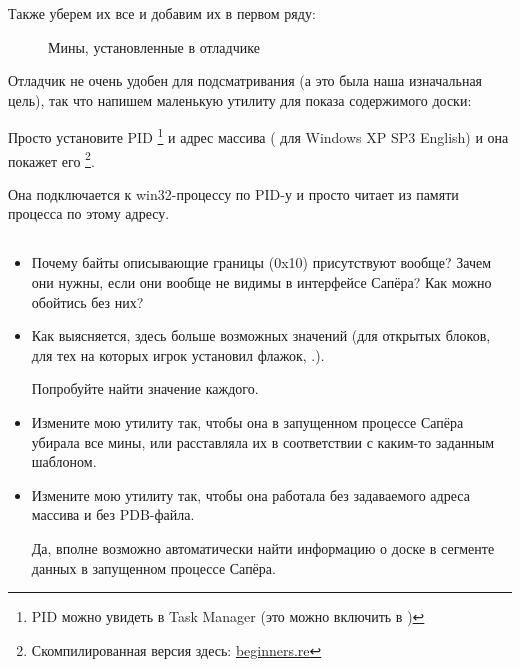 Также уберем их все и добавим их в первом ряду: 

\begin{figure}[H]
\centering
{}
\caption{Мины, установленные в отладчике}
\label{fig:minesweeper2}
\end{figure}

Отладчик не очень удобен для подсматривания (а это была наша изначальная цель), так что напишем маленькую
утилиту для показа содержимого доски:



Просто установите \ac{PID}
\footnote{PID можно увидеть в Task Manager 
(это можно включить в )} 
и адрес массива ( для Windows XP SP3 English) 
и она покажет его
\footnote{Скомпилированная версия здесь: 
\href{http://go.yurichev.com/17165}{beginners.re}}.

Она подключается к win32-процессу по \ac{PID}-у и просто читает из памяти процесса по этому адресу.

\subsection{\Exercises}

\begin{itemize}

\item
Почему байты описывающие границы (0x10) присутствуют вообще?
Зачем они нужны, если они вообще не видимы в интерфейсе Сапёра?
Как можно обойтись без них?

\item
Как выясняется, здесь больше возможных значений (для открытых блоков, для тех на которых игрок установил
флажок, \etc{}.).
	
Попробуйте найти значение каждого.

\item Измените мою утилиту так, чтобы она в запущенном процессе Сапёра убирала все мины, 
или расставляла их в соответствии с каким-то заданным шаблоном.

\item Измените мою утилиту так, чтобы она работала без задаваемого адреса массива и без \gls{PDB}-файла.

Да, вполне возможно автоматически найти информацию о доске в сегменте данных в запущенном процессе Сапёра.

%

\end{itemize}
